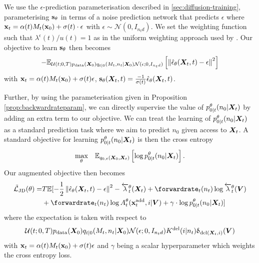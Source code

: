 We use the $\epsilon$-prediction parameterisation described in \cref{sec:diffusion-training}, parameterising ${\mathbf{s}}_\theta$ in terms of a noise prediction network that predicts $\epsilon$ where ${\mathbf{x}}_t = \alpha(t) M_t({\mathbf{x}}_0) + \sigma(t) \cdot \epsilon$ with $\epsilon \sim \mathcal{N}(0, I_{n_t d})$. We set the weighting function such that $\lambda^\epsilon(t)/u(t) = 1$ as in the uniform weighting approach used by \citet{song2020score}. Our objective to learn ${\mathbf{s}}_\theta$ then becomes
\begin{equation}
    - \mathbb{E}_{\mathcal{U}(t; 0, T) p_{\rm{data}}({\bm{X}}_0) q_{t|0}(M_t, n_t | {\bm{X}}_0) \mathcal{N}(\epsilon; 0, I_{n_t d})} \left[ \left\lVert\hat{\mathbf{\epsilon}}_\theta({\bm{X}}_t, t) - \epsilon\right\rVert^2 \right]
\end{equation}
with ${\mathbf{x}}_t = \alpha(t) M_t({\mathbf{x}}_0) + \sigma(t) \epsilon$, ${\mathbf{s}}_\theta({\bm{X}}_t, t) = \frac{-1}{\sigma(t)} \hat{\mathbf{\epsilon}}_\theta({\bm{X}}_t, t)$.

Further, by using the parameterisation given in Proposition \ref{prop:backwardrateparam}, we can directly supervise the value of $p_{0|t}^\theta(n_0 | {\bm{X}}_t)$ by adding an extra term to our objective. We can treat the learning of $p_{0|t}^\theta(n_0 | {\bm{X}}_t)$ as a standard prediction task where we aim to predict $n_0$ given access to ${\bm{X}}_t$. A standard objective for learning $p_{0|t}^\theta(n_0 | {\bm{X}}_t)$ is then the cross entropy
\begin{equation}
    \underset{\theta}{\text{max}} \quad \mathbb{E}_{q_{0,t}({\bm{X}}_0, {\bm{X}}_t)} \left[ \log p_{0|t}^{\theta}(n_0 | {\bm{X}}_t) \right] .
\end{equation}
Our augmented objective then becomes
\begin{align} \label{eq:augmentedObjective}
    \tilde{\mathcal{L}}_\text{JD}(\theta) = &T\mathbb{E} [ -\frac{1}{2}\norm{\hat{\mathbf{\epsilon}}_\theta(\mX_t, t) - \epsilon}^2 - \backwardrate_t^\theta(\mX_t) + \forwardrate_t(n_t) \log \backwardrate_t^\theta(\mV) \\ 
    &+ \forwardrate_t(n_t) \log \autonet_t^\theta(\xadd_t, i | \mV) + \gamma \cdot \log p_{0|t}^\theta (n_0 | \mX_t) ] \nonumber
\end{align}
where the expectation is taken with respect to 
\begin{equation}
\mathcal{U}(t; 0, T) p_{\rm{data}}({\bm{X}}_0) q_{t|0}(M_t, n_t | {\bm{X}}_0) \mathcal{N}(\epsilon; 0, I_{n_t d}) K^{\textup{del}}(i | n_t) \updelta_{\text{del}({\bm{X}}_t, i)}({\bm{V}})
\end{equation}
with ${\mathbf{x}}_t = \alpha(t) M_t({\mathbf{x}}_0) + \sigma(t) \epsilon$ and $\gamma$ being a scalar hyperparameter which weights the cross entropy loss.


